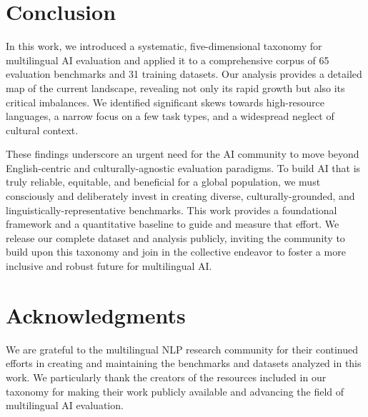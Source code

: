 \documentclass[acmsmall]{acmart}
\begin{document}
\section{Conclusion}

In this work, we introduced a systematic, five-dimensional taxonomy for multilingual AI evaluation and applied it to a comprehensive corpus of 65 evaluation benchmarks and 31 training datasets. Our analysis provides a detailed map of the current landscape, revealing not only its rapid growth but also its critical imbalances. We identified significant skews towards high-resource languages, a narrow focus on a few task types, and a widespread neglect of cultural context.

These findings underscore an urgent need for the AI community to move beyond English-centric and culturally-agnostic evaluation paradigms. To build AI that is truly reliable, equitable, and beneficial for a global population, we must consciously and deliberately invest in creating diverse, culturally-grounded, and linguistically-representative benchmarks. This work provides a foundational framework and a quantitative baseline to guide and measure that effort. We release our complete dataset and analysis publicly, inviting the community to build upon this taxonomy and join in the collective endeavor to foster a more inclusive and robust future for multilingual AI.

\section*{Acknowledgments}

We are grateful to the multilingual NLP research community for their continued efforts in creating and maintaining the benchmarks and datasets analyzed in this work. We particularly thank the creators of the resources included in our taxonomy for making their work publicly available and advancing the field of multilingual AI evaluation.






\appendix
\end{document}
